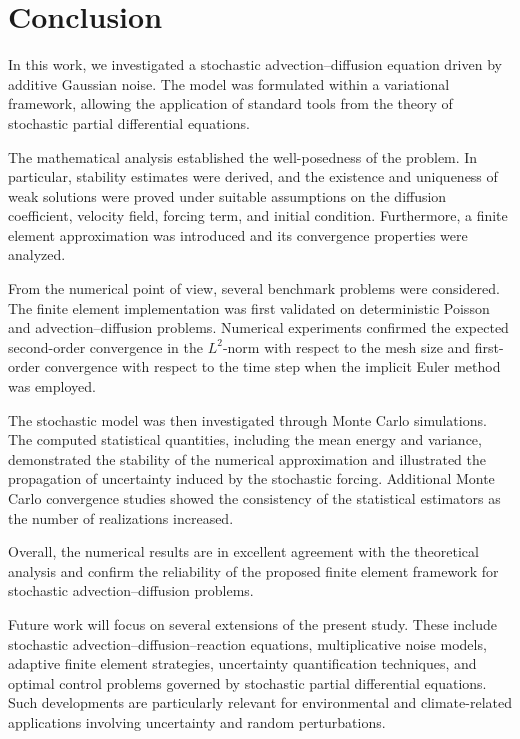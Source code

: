 \section{Conclusion}

In this work, we investigated a stochastic advection--diffusion equation driven by additive 
Gaussian noise. The model was formulated within a variational framework, allowing the 
application of standard tools from the theory of stochastic partial differential equations.

The mathematical analysis established the well-posedness of the problem. In particular, 
stability estimates were derived, and the existence and uniqueness of weak solutions were 
proved under suitable assumptions on the diffusion coefficient, velocity field, forcing 
term, and initial condition. Furthermore, a finite element approximation was introduced 
and its convergence properties were analyzed.

From the numerical point of view, several benchmark problems were considered. The finite 
element implementation was first validated on deterministic Poisson and advection--diffusion 
problems. Numerical experiments confirmed the expected second-order convergence in the 
\(L^2\)-norm with respect to the mesh size and first-order convergence with respect to the 
time step when the implicit Euler method was employed.

The stochastic model was then investigated through Monte Carlo simulations. The computed 
statistical quantities, including the mean energy and variance, demonstrated the stability 
of the numerical approximation and illustrated the propagation of uncertainty induced by 
the stochastic forcing. Additional Monte Carlo convergence studies showed the consistency 
of the statistical estimators as the number of realizations increased.

Overall, the numerical results are in excellent agreement with the theoretical analysis 
and confirm the reliability of the proposed finite element framework for stochastic 
advection--diffusion problems.

Future work will focus on several extensions of the present study. These include stochastic 
advection--diffusion--reaction equations, multiplicative noise models, adaptive finite 
element strategies, uncertainty quantification techniques, and optimal control problems 
governed by stochastic partial differential equations. Such developments are particularly 
relevant for environmental and climate-related applications involving uncertainty and 
random perturbations.
